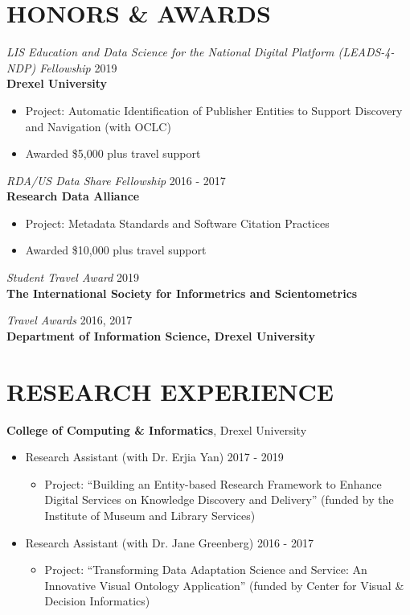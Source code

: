 \documentclass[margin, 10pt]{res} %
\begin{document}
\begin{resume}

\section{HONORS \& AWARDS}

{\sl LIS Education and Data Science for the National Digital Platform (LEADS-4-NDP) Fellowship}  \hfill 2019 \\
\textbf{Drexel University}
\begin{itemize}
\item Project: Automatic Identification of Publisher Entities to Support Discovery and Navigation (with OCLC)
\item Awarded \$5,000 plus travel support
\end{itemize} 

{\sl RDA/US Data Share Fellowship}  \hfill 2016 - 2017 \\
\textbf{Research Data Alliance}
\begin{itemize}
\item Project: Metadata Standards and Software Citation Practices
\item Awarded \$10,000 plus travel support
\end{itemize} 

{\sl Student Travel Award} \hfill 2019 \\
\textbf{The International Society for Informetrics and Scientometrics}

{\sl Travel Awards} \hfill 2016, 2017 \\
\textbf{Department of Information Science, Drexel University}

\section{RESEARCH EXPERIENCE}

\textbf{College of Computing \& Informatics}, Drexel University\\
\begin{itemize}
     \item Research Assistant (with Dr. Erjia Yan) \hfill 2017 - 2019
     \begin{itemize}
     	\item  Project: “Building an Entity-based Research Framework to Enhance Digital Services on Knowledge Discovery and Delivery” (funded by the Institute of Museum and Library Services)
   	\end{itemize}
   	\item Research Assistant (with Dr. Jane Greenberg) \hfill 2016 - 2017
     \begin{itemize}
     	\item  Project: “Transforming Data Adaptation Science and Service: An Innovative Visual Ontology Application” (funded by Center for Visual \& Decision Informatics)
   	\end{itemize}
\end{itemize}


\end{resume}
\end{document}
